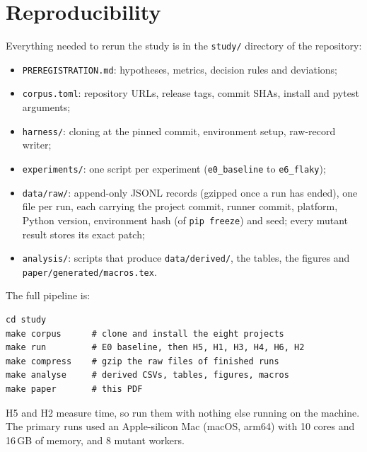 \section{Reproducibility}
\label{app:repro}

Everything needed to rerun the study is in the \texttt{study/} directory of the repository:
\begin{itemize}
  \item \texttt{PREREGISTRATION.md}: hypotheses, metrics, decision rules and deviations;
  \item \texttt{corpus.toml}: repository URLs, release tags, commit SHAs, install and pytest arguments;
  \item \texttt{harness/}: cloning at the pinned commit, environment setup, raw-record writer;
  \item \texttt{experiments/}: one script per experiment (\texttt{e0\_baseline} to \texttt{e6\_flaky});
  \item \texttt{data/raw/}: append-only JSONL records (gzipped once a run has ended), one file per run, each carrying the project commit, runner commit, platform, Python version, environment hash (of \texttt{pip freeze}) and seed; every mutant result stores its exact patch;
  \item \texttt{analysis/}: scripts that produce \texttt{data/derived/}, the tables, the figures and \texttt{paper/generated/macros.tex}.
\end{itemize}

\noindent The full pipeline is:
\begin{verbatim}
cd study
make corpus      # clone and install the eight projects
make run         # E0 baseline, then H5, H1, H3, H4, H6, H2
make compress    # gzip the raw files of finished runs
make analyse     # derived CSVs, tables, figures, macros
make paper       # this PDF
\end{verbatim}

H5 and H2 measure time, so run them with nothing else running on the machine. The primary runs used an Apple-silicon Mac (macOS, arm64) with 10 cores and 16\,GB of memory, and 8 mutant workers.


